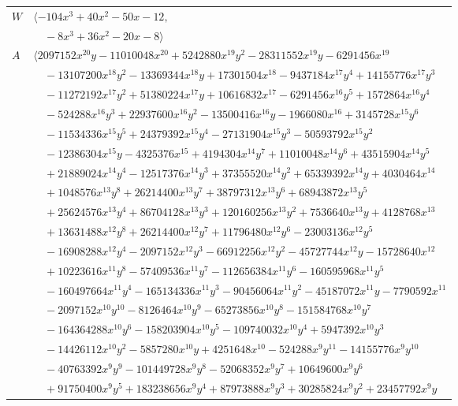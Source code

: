 \documentclass[11pt]{article}
\begin{document}
\begin{longtable}{@{}ll@{}}
$W$ & $\langle -104x^{3}+40x^{2}-50x-12,$\\
 & $\quad -8x^{3}+36x^{2}-20x-8\rangle$\\
$A$ & $\langle 2097152x^{20}y-11010048x^{20}+5242880x^{19}y^{2}-28311552x^{19}y-6291456x^{19}$\\
 & $\quad -13107200x^{18}y^{2}-13369344x^{18}y+17301504x^{18}-9437184x^{17}y^{4}+14155776x^{17}y^{3}$\\
 & $\quad -11272192x^{17}y^{2}+51380224x^{17}y+10616832x^{17}-6291456x^{16}y^{5}+1572864x^{16}y^{4}$\\
 & $\quad -524288x^{16}y^{3}+22937600x^{16}y^{2}-13500416x^{16}y-1966080x^{16}+3145728x^{15}y^{6}$\\
 & $\quad -11534336x^{15}y^{5}+24379392x^{15}y^{4}-27131904x^{15}y^{3}-50593792x^{15}y^{2}$\\
 & $\quad -12386304x^{15}y-4325376x^{15}+4194304x^{14}y^{7}+11010048x^{14}y^{6}+43515904x^{14}y^{5}$\\
 & $\quad +21889024x^{14}y^{4}-12517376x^{14}y^{3}+37355520x^{14}y^{2}+65339392x^{14}y+4030464x^{14}$\\
 & $\quad +1048576x^{13}y^{8}+26214400x^{13}y^{7}+38797312x^{13}y^{6}+68943872x^{13}y^{5}$\\
 & $\quad +25624576x^{13}y^{4}+86704128x^{13}y^{3}+120160256x^{13}y^{2}+7536640x^{13}y+4128768x^{13}$\\
 & $\quad +13631488x^{12}y^{8}+26214400x^{12}y^{7}+11796480x^{12}y^{6}-23003136x^{12}y^{5}$\\
 & $\quad -16908288x^{12}y^{4}-2097152x^{12}y^{3}-66912256x^{12}y^{2}-45727744x^{12}y-15728640x^{12}$\\
 & $\quad +10223616x^{11}y^{8}-57409536x^{11}y^{7}-112656384x^{11}y^{6}-160595968x^{11}y^{5}$\\
 & $\quad -160497664x^{11}y^{4}-165134336x^{11}y^{3}-90456064x^{11}y^{2}-45187072x^{11}y-7790592x^{11}$\\
 & $\quad -2097152x^{10}y^{10}-8126464x^{10}y^{9}-65273856x^{10}y^{8}-151584768x^{10}y^{7}$\\
 & $\quad -164364288x^{10}y^{6}-158203904x^{10}y^{5}-109740032x^{10}y^{4}+5947392x^{10}y^{3}$\\
 & $\quad -14426112x^{10}y^{2}-5857280x^{10}y+4251648x^{10}-524288x^{9}y^{11}-14155776x^{9}y^{10}$\\
 & $\quad -40763392x^{9}y^{9}-101449728x^{9}y^{8}-52068352x^{9}y^{7}+10649600x^{9}y^{6}$\\
 & $\quad +91750400x^{9}y^{5}+183238656x^{9}y^{4}+87973888x^{9}y^{3}+30285824x^{9}y^{2}+23457792x^{9}y$\\

\end{longtable}
\end{document}

